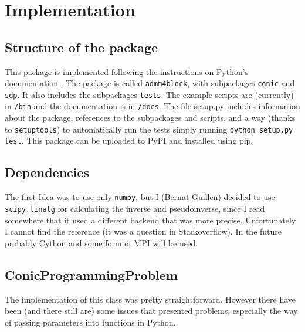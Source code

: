 \documentclass[paper=a4, fontsize=11pt]{scrartcl}
\numberwithin{equation}{section}		%
\numberwithin{figure}{section}			%
\numberwithin{table}{section}				%
\begin{document}
\section{Implementation}
\subsection{Structure of the package}
This package is implemented following the instructions on Python's documentation \cite{pythondocs}. The package is called \texttt{admm4block}, with subpackages \texttt{conic} and \texttt{sdp}. It also includes the subpackages \texttt{tests}. The example scripts are (currently) in \texttt{/bin} and the documentation is in \texttt{/docs}. The file setup.py includes information about the package, references to the subpackages and scripts, and a way (thanks to \texttt{setuptools}) to automatically run the tests simply running \texttt{python setup.py test}. This package can be uploaded to PyPI and installed using pip.
\subsection{Dependencies}
The first Idea was to use only \texttt{numpy}, but I (Bernat Guillen) decided to use \texttt{scipy.linalg} for calculating the inverse and pseudoinverse, since I read somewhere that it used a different backend that was more precise. Unfortunately I cannot find the reference (it was a question in Stackoverflow). In the future probably Cython and some form of MPI will be used.
\subsection{ConicProgrammingProblem\label{sec:cp}}
The implementation of this class was pretty straightforward. However there have been (and there still are) some issues that presented problems, especially the way of passing parameters into functions in Python. 
\end{document}
